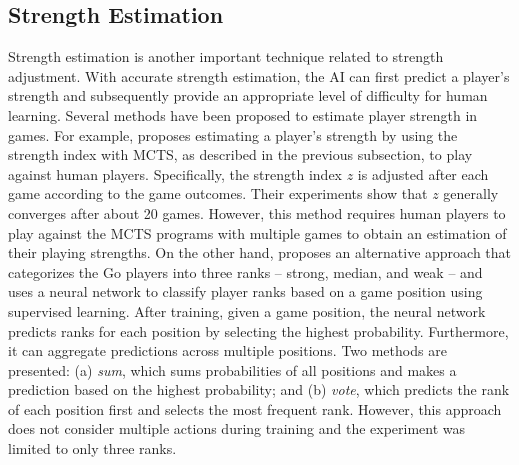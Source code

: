 \subsection{Strength Estimation}
\label{subsec:bg_se}
Strength estimation is another important technique related to strength adjustment.
With accurate strength estimation, the AI can first predict a player's strength and subsequently provide an appropriate level of difficulty for human learning.
Several methods \citep{moudrik_determining_2016, liu_strength_2020, egri-nagy_derived_2020, scheible_picking_2014} have been proposed to estimate player strength in games.
For example, \citet{liu_strength_2020} proposes estimating a player's strength by using the strength index with MCTS, as described in the previous subsection, to play against human players.
Specifically, the strength index $z$ is adjusted after each game according to the game outcomes.
Their experiments show that $z$ generally converges after about 20 games.
However, this method requires human players to play against the MCTS programs with multiple games to obtain an estimation of their playing strengths.
On the other hand, \citet{moudrik_determining_2016} proposes an alternative approach that categorizes the Go players into three ranks -- strong, median, and weak -- and uses a neural network to classify player ranks based on a game position using supervised learning.
After training, given a game position, the neural network predicts ranks for each position by selecting the highest probability.
Furthermore, it can aggregate predictions across multiple positions.
Two methods are presented: (a) \textit{sum}, which sums probabilities of all positions and makes a prediction based on the highest probability; and (b) \textit{vote}, which predicts the rank of each position first and selects the most frequent rank.
However, this approach does not consider multiple actions during training and the experiment was limited to only three ranks.




